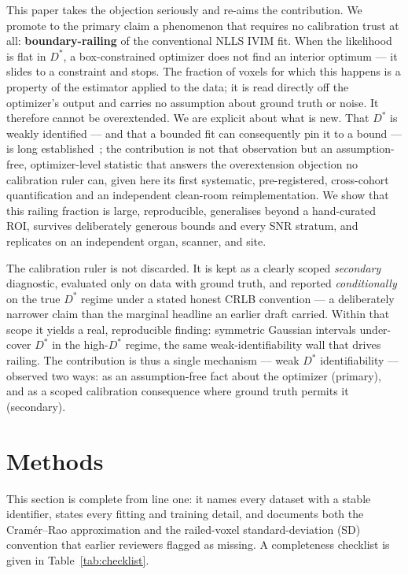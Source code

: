 \documentclass[11pt]{article}
\newcommand{\Ds}{D^{*}}
\begin{document}
This paper takes the objection seriously and re-aims the contribution. We promote
to the primary claim a phenomenon that requires no calibration trust at all:
\textbf{boundary-railing} of the conventional NLLS IVIM fit. When the likelihood
is flat in $\Ds$, a box-constrained optimizer does not find an interior optimum
--- it slides to a constraint and stops. The fraction of voxels for which this
happens is a property of the estimator applied to the data; it is read directly
off the optimizer's output and carries no assumption about ground truth or noise.
It therefore cannot be overextended. We are explicit about what is new. That
$\Ds$ is weakly identified --- and that a bounded fit can consequently pin it to a
bound --- is long established~\cite{koh2011,lemke2011}; the contribution is not
that observation but an assumption-free, optimizer-level statistic that answers
the overextension objection no calibration ruler can, given here its first
systematic, pre-registered, cross-cohort quantification and an independent
clean-room reimplementation. We show that this railing fraction is large,
reproducible, generalises beyond a hand-curated ROI, survives deliberately
generous bounds and every SNR stratum, and replicates on an independent organ,
scanner, and site.

The calibration ruler is not discarded. It is kept as a clearly scoped
\emph{secondary} diagnostic, evaluated only on data with ground truth, and
reported \emph{conditionally} on the true $\Ds$ regime under a stated honest
CRLB convention --- a deliberately narrower claim than the marginal headline an
earlier draft carried. Within that scope it yields a real, reproducible finding:
symmetric Gaussian intervals under-cover $\Ds$ in the high-$\Ds$ regime, the same
weak-identifiability wall that drives railing. The contribution is thus a single
mechanism --- weak $\Ds$ identifiability --- observed two ways: as an
assumption-free fact about the optimizer (primary), and as a scoped calibration
consequence where ground truth permits it (secondary).

\section{Methods}
\label{sec:methods}

This section is complete from line one: it names every dataset with a stable
identifier, states every fitting and training detail, and documents both the
Cram\'er--Rao approximation and the railed-voxel standard-deviation (SD)
convention that earlier reviewers flagged as missing. A completeness checklist is
given in Table~\ref{tab:checklist}.
\end{document}
